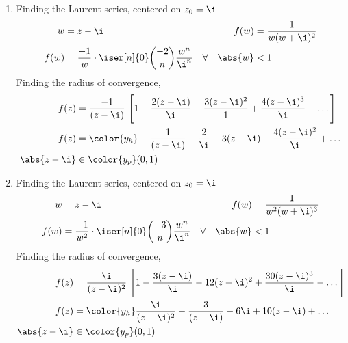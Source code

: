 \begin{enumerate}
    \item Finding the Laurent series, centered on $ z_0 = \i $
          \begin{align}
              w                                 & = z - \i                         &
              f(w)                              & = \frac{1}{w(w + \i)^2}            \\
              f(w)                              & = \frac{-1}{w} \cdot \iser[n]{0}
              \binom{-2}{n}\frac{w^{n}}{\i^{n}} &
              \forall \quad  \abs{w}            & < 1
          \end{align}
          Finding the radius of convergence,
          \begin{align}
              f(z)         & = \frac{-1}{(z - \i)}\ \Bigg[ 1 - \frac{2(z - \i)}{\i}
              - \frac{3(z - \i)^2}{1} + \frac{4(z - \i)^3}{\i} - \dots \Bigg]       \\
              f(z)         & = \color{y_h} -\frac{1}{(z - \i)}
              + \frac{2}{\i} + 3(z - \i) - \frac{4(z-\i)^2}{\i} + \dots             \\
              \abs{z - \i} & \in \color{y_p} (0, 1)
          \end{align}

    \item Finding the Laurent series, centered on $ z_0 = \i $
          \begin{align}
              w                                 & = z - \i                           &
              f(w)                              & = \frac{1}{w^2(w + \i)^3}            \\
              f(w)                              & = \frac{-1}{w^2} \cdot \iser[n]{0}
              \binom{-3}{n}\frac{w^{n}}{\i^{n}} &
              \forall \quad  \abs{w}            & < 1
          \end{align}
          Finding the radius of convergence,
          \begin{align}
              f(z)         & = \frac{\i}{(z - \i)^2}\ \Bigg[ 1 - \frac{3(z - \i)}{\i}
              - 12(z - \i)^2 + \frac{30(z - \i)^3}{\i} - \dots \Bigg]                 \\
              f(z)         & = \color{y_h} \frac{\i}{(z - \i)^2}
              - \frac{3}{(z - \i)} - 6\i + 10(z-\i) + \dots                           \\
              \abs{z - \i} & \in \color{y_p} (0, 1)
          \end{align}


\end{enumerate}
